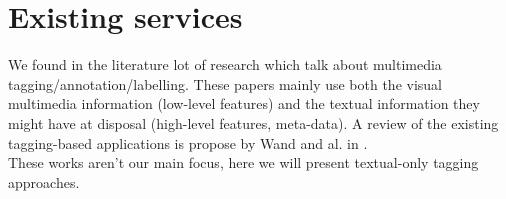 
\chapter{Existing services} %

\label{chapter:ExistingServices} %


We found in the literature lot of research which talk about multimedia tagging/annotation/labelling. These papers mainly use both the visual multimedia information (low-level features) and the textual information they might have at disposal (high-level features, meta-data). A review of the existing tagging-based applications is propose by Wand and al. in \cite{wang2012assistive}.\\
These works aren't our main focus, here we will present textual-only tagging approaches.

